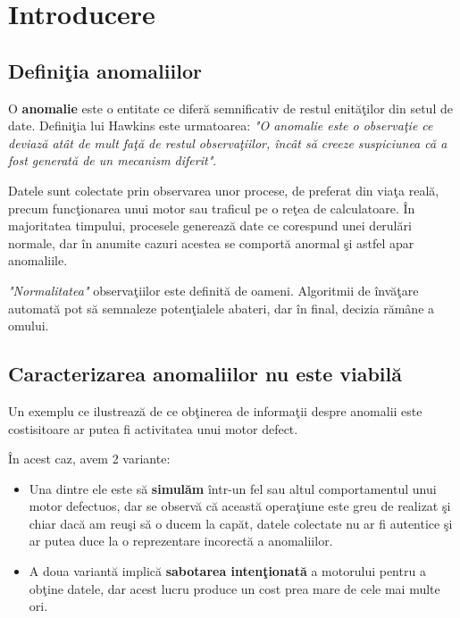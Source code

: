 \chapter{Introducere}

\section{Definiţia anomaliilor}

O \textbf{anomalie} este o entitate ce diferă semnificativ de restul enităţilor din 
setul de date. Definiţia lui Hawkins este urmatoarea\cite{hawkins1980identification}:
\textit{"O anomalie este o observaţie ce deviază atât de mult faţă de restul observaţiilor,
încât să creeze suspiciunea că a fost generată de un mecanism diferit"}.

Datele sunt colectate prin observarea unor procese, de preferat din viaţa reală, 
precum funcţionarea
unui motor sau traficul pe o reţea de calculatoare. În majoritatea timpului, procesele
generează date ce corespund unei derulări normale, dar în anumite cazuri acestea se 
comportă anormal şi astfel apar anomaliile. 

\textit{"Normalitatea"} observaţiilor este definită
de oameni. Algoritmii de învăţare automată pot să semnaleze potenţialele
abateri, dar în final, decizia rămâne a omului.

\section{Caracterizarea anomaliilor nu este viabilă}

Un exemplu ce ilustrează de ce obţinerea de informaţii
despre anomalii este costisitoare ar putea fi activitatea unui
motor defect.

În acest caz, avem 2 variante:
\begin{itemize}
    \item Una dintre ele 
        este să \textbf{simulăm} 
        într-un fel sau altul comportamentul unui motor defectuos, dar 
        se observă că această operaţiune este greu de realizat şi chiar dacă am reuşi 
        să o ducem la capăt, datele colectate nu ar fi autentice şi ar putea duce 
        la o reprezentare incorectă a anomaliilor. 

    \item A doua variantă implică \textbf{sabotarea 
        intenţionată} a motorului pentru a obţine datele, dar acest lucru produce un 
        cost prea mare de cele mai multe ori. 
\end{itemize}

